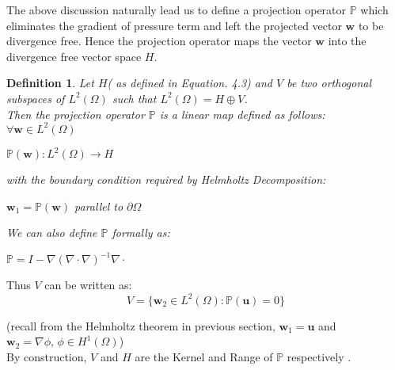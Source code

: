 The above discussion naturally lead us to define a projection operator $\mathbb{P}$ which eliminates the gradient of pressure term and left the projected vector $\textbf{w}$ to be divergence free. Hence the projection operator maps the vector $\textbf{w}$ into the divergence free vector space $H$. 

\newtheorem{mydef}{Definition}
\begin{mydef}
Let $\textit{H}$( as defined in Equation. 4.3) and $\textit{V}$ be two orthogonal subspaces of $\textit{L}^2 (\Omega)$ such that $\textit{L}^2 (\Omega) = \textit{H} \oplus \textit{V}$.\\

Then the projection operator $\mathbb{P}$ is a linear map defined as follows:\\
$\forall \textbf{w} \in \textit{L}^2 (\Omega)$
\begin{center}
$\mathbb{P} (\textbf{w}): \textit{L}^2 (\Omega) \rightarrow \textit{H}$\\
\end{center}
with the boundary condition required by Helmholtz Decomposition:
\begin{center}
$\textbf{w}_1 = \mathbb{P} (\textbf{w})$ parallel to $\partial \Omega$
\end{center}
We can also define $\mathbb{P}$ formally as:
\begin{center}
$\mathbb{P} = I - \nabla (\nabla \cdot \nabla)^{-1} \nabla \cdot$\\
\end{center}
\end{mydef}

Thus $\textit{V}$ can be written as:
\begin{dmath*}
V = \lbrace { \textbf{w}_2 \in \textit{L}^2 (\Omega): \mathbb{P} (\textbf{u}) = 0} \rbrace 
\end{dmath*}

(recall from the Helmholtz theorem in previous section, $\textbf{w}_1 = \textbf{u}$ and $\textbf{w}_2 = \nabla \phi,\,\phi \in H^1(\Omega)$)\\

By construction, $\textit{V}$ and $\textit{H}$ are the Kernel and Range of $\mathbb{P}$ respectively .\\

